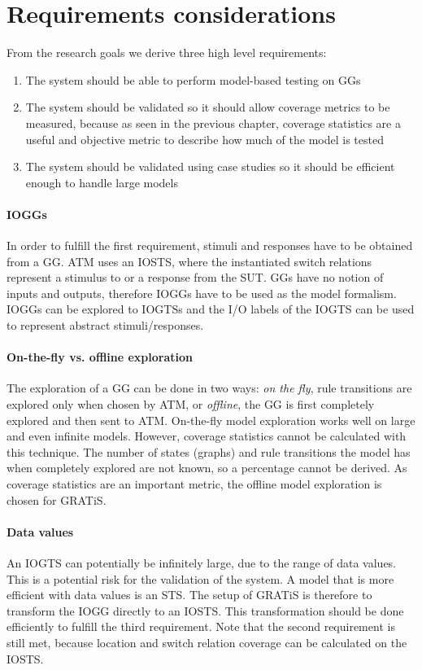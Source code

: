 \section{Requirements considerations}
From the research goals we derive three high level requirements:
\begin{enumerate}
\item The system should be able to perform model-based testing on GGs
\item The system should be validated so it should allow coverage metrics to be measured, because as seen in the previous chapter, coverage statistics are a useful and objective metric to describe how much of the model is tested
\item The system should be validated using case studies so it should be efficient enough to handle large models
\end{enumerate}

\paragraph*{IOGGs} In order to fulfill the first requirement, stimuli and responses have to be obtained from a GG. ATM uses an IOSTS, where the instantiated switch relations represent a stimulus to or a response from the SUT. GGs have no notion of inputs and outputs, therefore IOGGs have to be used as the model formalism. IOGGs can be explored to IOGTSs and the I/O labels of the IOGTS can be used to represent abstract stimuli/responses.

\paragraph*{On-the-fly vs. offline exploration} The exploration of a GG can be done in two ways: \textit{on the fly}, rule transitions are explored only when chosen by ATM, or \textit{offline}, the GG is first completely explored and then sent to ATM. On-the-fly model exploration works well on large and even infinite models. However, coverage statistics cannot be calculated with this technique. The number of states (graphs) and rule transitions the model has when completely explored are not known, so a percentage cannot be derived. As coverage statistics are an important metric, the offline model exploration is chosen for GRATiS.

\paragraph*{Data values} An IOGTS can potentially be infinitely large, due to the range of data values. This is a potential risk for the validation of the system. A model that is more efficient with data values is an STS. The setup of GRATiS is therefore to transform the IOGG directly to an IOSTS. This transformation should be done efficiently to fulfill the third requirement. Note that the second requirement is still met, because location and switch relation coverage can be calculated on the IOSTS.

